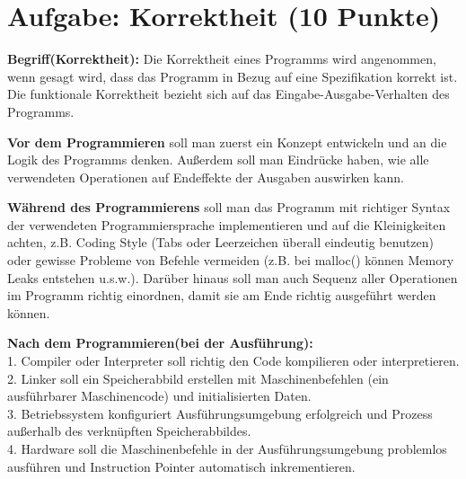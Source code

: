 \usepackage{graphicx}

\newcommand{\dozent}{Claudia Müller-Birn und Barry Linnert}					%
\newcommand{\tutor}{Florian Alex}						%
\newcommand{\tutoriumNo}{Übung 05}				%
\newcommand{\ubungNo}{1}									%
\newcommand{\veranstaltung}{Nichtsequentielle und verteilte Programmierung}	%
\newcommand{\semester}{SoSe 2020}						%
\newcommand{\studenten}{Qianli Wang und Nazar Sopiha}			%




\section{Aufgabe: Korrektheit \hfill (10 Punkte)}
 \textbf{Begriff(Korrektheit):} Die Korrektheit eines Programms wird angenommen, wenn gesagt wird, dass das Programm in Bezug auf eine Spezifikation korrekt ist. Die funktionale Korrektheit bezieht sich auf das Eingabe-Ausgabe-Verhalten des Programms. 

 \textbf{Vor dem Programmieren} soll man zuerst ein Konzept entwickeln und an die Logik des Programms denken. Außerdem soll man Eindrücke haben, wie alle verwendeten Operationen auf Endeffekte der Ausgaben auswirken kann.

 \textbf{Während des Programmierens} soll man das Programm mit richtiger Syntax der verwendeten Programmiersprache implementieren und auf die Kleinigkeiten achten, z.B. Coding Style (Tabs oder Leerzeichen überall eindeutig benutzen) oder gewisse Probleme von Befehle vermeiden (z.B. bei malloc() können Memory Leaks entstehen u.s.w.). Darüber hinaus soll man auch Sequenz aller Operationen im Programm richtig einordnen, damit sie am Ende richtig ausgeführt werden können.

 \textbf{Nach dem Programmieren(bei der Ausführung):}\\
1. Compiler oder Interpreter soll richtig den Code kompilieren oder interpretieren. \\
2. Linker soll ein Speicherabbild erstellen mit Maschinenbefehlen (ein ausführbarer Maschinencode) und initialisierten Daten.\\
3. Betriebssystem konfiguriert Ausführungsumgebung erfolgreich und Prozess außerhalb des verknüpften Speicherabbildes.\\
4. Hardware soll die Maschinenbefehle in der Ausführungsumgebung problemlos ausführen und Instruction Pointer automatisch inkrementieren.

